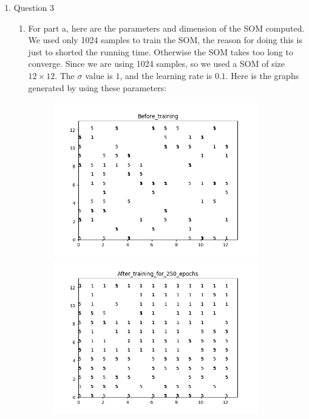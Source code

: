 \documentclass[11pt]{article}
\begin{document}
\begin{enumerate}
\item Question 3

\begin{enumerate}
\item For part a, here are the parameters and dimension of the SOM computed. We used only 1024 samples to train the SOM, the reason for doing this is just to shorted the running time. Otherwise the SOM takes too long to converge. Since we are using 1024 samples, so we used a SOM of size $12 \times 12$. The $\sigma$ value is $1$, and the learning rate is $0.1$. Here is the graphs generated by using these parameters:\\
\begin{figure}[h!]
    \centering
    \begin{minipage}{0.45\textwidth}
    	\centering
        \includegraphics[width=0.9\textwidth]{Before_training}
    \end{minipage}\hfill
    \begin{minipage}{0.45\textwidth}
    	\centering
         \includegraphics[width=0.9\textwidth]{After_training_for_250_epochs}

\end{minipage}
\end{figure}
\end{enumerate}
\end{enumerate}
\end{document}
